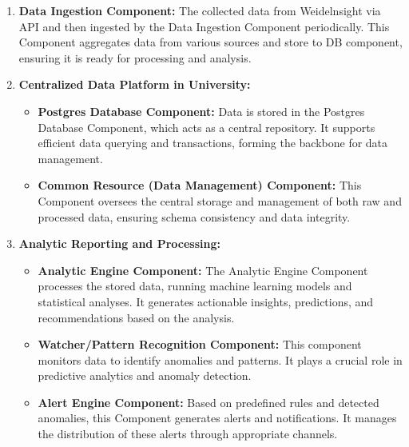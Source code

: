 \documentclass[11pt]{article}
\begin{document}
\begin{enumerate}[label=\arabic*., wide=0pt, left=0pt]

    \item \textbf{Data Ingestion Component:} The collected data from Weidelnsight via API and then ingested by the Data Ingestion Component periodically. This Component aggregates data from various sources and store to DB component, ensuring it is ready for processing and analysis.

    \item \textbf{Centralized Data Platform in University:}
    \begin{itemize}
        \item \textbf{Postgres Database Component:} Data is stored in the Postgres Database Component, which acts as a central repository. It supports efficient data querying and transactions, forming the backbone for data management.
        \item \textbf{Common Resource (Data Management) Component:} This Component oversees the central storage and management of both raw and processed data, ensuring schema consistency and data integrity.
    \end{itemize}

    \item \textbf{Analytic Reporting and Processing:}
    \begin{itemize}
        \item \textbf{Analytic Engine Component:} The Analytic Engine Component processes the stored data, running machine learning models and statistical analyses. It generates actionable insights, predictions, and recommendations based on the analysis.
        \item \textbf{Watcher/Pattern Recognition Component:} This component monitors data to identify anomalies and patterns. It plays a crucial role in predictive analytics and anomaly detection.
        \item \textbf{Alert Engine Component:} Based on predefined rules and detected anomalies, this Component generates alerts and notifications. It manages the distribution of these alerts through appropriate channels.
    \end{itemize}


\end{enumerate}
\end{document}
